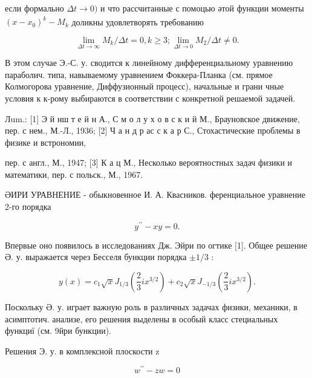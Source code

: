 \documentclass[10pt]{article}
\begin{document}
если формально $\Delta t \rightarrow 0)$ и что рассчитанные с помоцью әтой функции моменты $\overline{\left(x-x_{0}\right)^{k}}-M_{k}$ доликны удовлетворять требованию



\[

\lim _{\Delta t \rightarrow \infty} M_{k} / \Delta t=0, k \geqslant 3 ; \lim _{\Delta t \rightarrow 0} M_{2} / \Delta t \neq 0 .

\]



В этом случае Э.-С. у. сводится к линейному дифференциальному уравнению параболич. типа, навываемому уравнением Фоккера-Планка (см. прямое Колмогорова уравнение, Диффузионный процесс), начальные и грани чные условия к к-рому выбираются в соответствии с конкретной решаемой задачей.



Лum.: [1] Э й нш т е й н А., С м о л у х о в с к и й М., Брауновское движение, пер. с нем., М.-Л., 1936; [2] Ч а н д р ас с к а р С., Стохастические проблемы в физике и встрономии,

пер. с англ., М., 1947; [3] К а ц М., Несколько вероятностных задач физики и математики, пер. с польск., М., 1967.



ӘИРИ УРАВНЕНИЕ - обыкновенное И. А. Квасников. ференциальное уравнение 2-го порядка



\[

y^{\prime \prime}-x y=0 .

\]



Впервые оно появилось в исследованиях Дж. Эйри по огтике [1]. Общее решение Ә. у. выражается через Бесселя бункции порядка $\pm 1 / 3$ :



\[

y(x)=c_{1} \sqrt{x} J_{1 / 3}\left(\frac{2}{3} i x^{3 / 2}\right)+c_{2} \sqrt{x} J_{-1 / 3}\left(\frac{2}{3} i x^{3 / 2}\right) .

\]



Поскольку Ә. у. играет важную роль в различных задачах физики, механики, в асимптотич. анализе, его решения выделены в особый класс стециальных функциї (см. 9йри бункции).



Решения Э. у. в комплексной плоскости z



\[

w^{\prime \prime}-z w=0

\]
\end{document}

